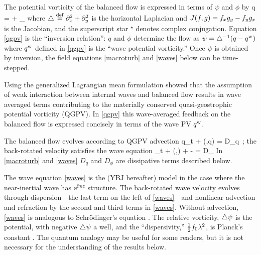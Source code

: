 \documentclass{jfm}
\newcommand{\NIW}{near-inertial wave}
\begin{document}

The potential vorticity of the balanced flow is expressed in terms of $\psi$ and $\phi$ by \beq
\label{qgpv}
q = \lap \psi +
                 _{ \qw}\com
\eeq
where $\triangle \stackrel{\mathrm{def}}{=} \partial_x^2 + \partial_y^2$ is the horizontal
Laplacian and $J(f,g)=f_x g_y - f_y g_x$ is the Jacobian, and
the superscript star $^\star$ denotes complex conjugation. Equation \eqref{qgpv}
is the ``inversion relation'': $q$ and $\phi$ determine the flow
as $\psi = \triangle^{-1} (q - q^{\mathrm{w}}) $ where
$q^{\mathrm{w}}$ defined in \eqref{qgpv} is the ``wave  potential vorticity.'' Once $\psi$ is obtained by inversion,
the field equations \eqref{macroturb} and \eqref{waves} below can be time-stepped.

Using the generalized  Lagrangian mean formulation \citet{buhler_mcintyre1998}
showed that the assumption of weak interaction between internal waves and balanced
flow results in wave averaged terms contributing to the materially conserved
quasi-geostrophic potential vorticity (QGPV). In \eqref{qgpv} this wave-averaged
feedback on the balanced  flow is  expressed concisely in terms of the wave PV  $q^{\mathrm{w}}$.

The balanced flow evolves according to  QGPV advection
\beq
\label{macroturb}
q_t + \sJ(\psi,q) = D_q\, ;
\eeq
the back-rotated velocity satisfies the  wave  equation
\beq
\label{waves}
\phi_t + \sJ(\psi,\phi) + \phi\lap \psi -  \disp \lap \phi
 = D_\phi\per
\eeq
In \eqref{macroturb} and \eqref{waves} $D_q$ and $D_\phi$ are dissipative terms
described below.

The wave equation \eqref{waves} is the \cite{young_benjelloul1997}  (YBJ hereafter) model in the
case where the \NIW{}  has $\ee^{\ii mz}$ structure. The back-rotated wave velocity
evolves through dispersion---the last term on the left of  \eqref{waves}---and
nonlinear advection and refraction by the second and third terms in
\eqref{waves}.  Without advection, \eqref{waves} is analogous to Schr\"odinger's
equation \citep[e.g.,][ page 51]{landau_lifshitz2013}. The relative vorticity,
$\triangle\psi$ is the potential, with negative $\triangle \psi$ a  well, and the
``dispersivity,'' $\tfrac{1}{2} f_0\lambda^2$, is Planck's constant \citep{danioux_etal2015}.
The quantum  analogy may be  useful for some readers, but it is not necessary for
the understanding of the results below.
\end{document}
